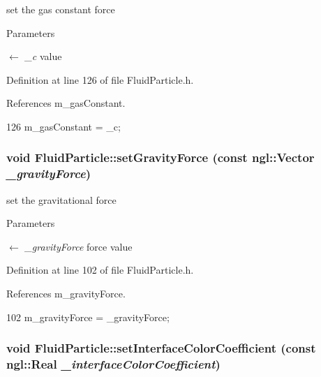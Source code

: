 set the gas constant force 


\begin{DoxyParams}{Parameters}
\item[\mbox{$\leftarrow$} {\em \_\-c}]value \end{DoxyParams}


Definition at line 126 of file FluidParticle.h.



References m\_\-gasConstant.




\begin{DoxyCode}
126 { m_gasConstant = _c; }
\end{DoxyCode}


\hypertarget{class_fluid_particle_aa50bfbb2492827bbe49e52159b98e28e}{
\subsubsection[{setGravityForce}]{\setlength{\rightskip}{0pt plus 5cm}void FluidParticle::setGravityForce (const ngl::Vector {\em \_\-gravityForce})}}
\label{class_fluid_particle_aa50bfbb2492827bbe49e52159b98e28e}


set the gravitational force 


\begin{DoxyParams}{Parameters}
\item[\mbox{$\leftarrow$} {\em \_\-gravityForce}]force value \end{DoxyParams}


Definition at line 102 of file FluidParticle.h.



References m\_\-gravityForce.




\begin{DoxyCode}
102 { m_gravityForce = _gravityForce; }
\end{DoxyCode}


\hypertarget{class_fluid_particle_a24edd2572ede213fba7dad12a9710ad0}{
\subsubsection[{setInterfaceColorCoefficient}]{\setlength{\rightskip}{0pt plus 5cm}void FluidParticle::setInterfaceColorCoefficient (const ngl::Real {\em \_\-interfaceColorCoefficient})}}
\label{class_fluid_particle_a24edd2572ede213fba7dad12a9710ad0}


